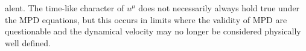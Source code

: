 alent. The time-like character of $u^{\mu}$ does not necessarily always hold true under the MPD equations, but this occurs in limits where the validity of MPD are questionable and the dynamical velocity may no longer be considered physically well defined.
